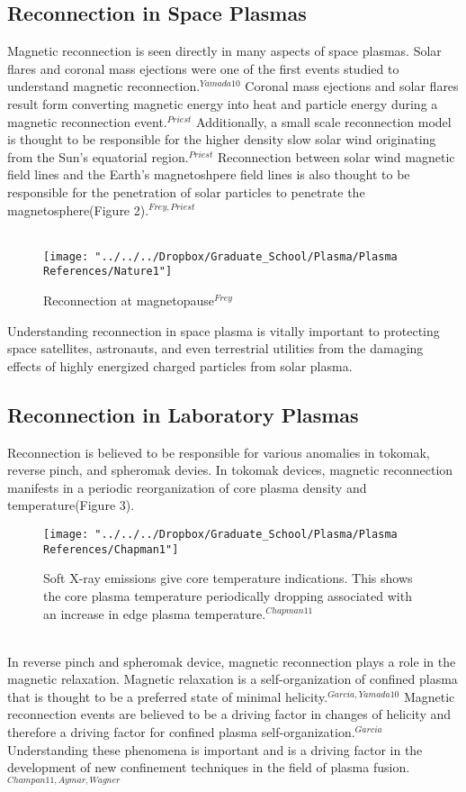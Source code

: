 \documentclass{article}
\begin{document}
\subsection{Reconnection in Space Plasmas}
Magnetic reconnection is seen directly in many aspects of space plasmas.  Solar flares and coronal mass ejections were one of the first events studied to understand magnetic reconnection.$^{Yamada10}$  Coronal mass ejections and solar flares result form converting magnetic energy into heat and particle energy during a magnetic reconnection event.$^{Priest}$  Additionally, a small scale reconnection model is thought to be responsible for the higher density slow solar wind originating from the Sun's equatorial region.$^{Priest}$  Reconnection between solar wind magnetic field lines and the Earth's magnetoshpere field lines is also thought to be responsible for the penetration of solar particles to penetrate the magnetosphere(Figure 2).$^{Frey,Priest}$\\\\\begin{figure}
\centering
\texttt{[image: "../../../Dropbox/Graduate\_School/Plasma/Plasma References/Nature1"]}
\caption{Reconnection at magnetopause$^{Frey}$}
\label{fig:Nature1}
\end{figure}
Understanding reconnection in space plasma is vitally important to protecting space satellites, astronauts, and even terrestrial utilities from the damaging effects of highly energized charged particles from solar plasma.
\subsection{Reconnection in Laboratory Plasmas}
Reconnection is believed to be responsible for various anomalies in tokomak, reverse pinch, and spheromak devies.  In tokomak devices, magnetic reconnection manifests in a periodic reorganization of core plasma density and temperature(Figure 3).  
\begin{figure}[h]
\centering
\texttt{[image: "../../../Dropbox/Graduate\_School/Plasma/Plasma References/Chapman1"]}
\caption{Soft X-ray emissions give core temperature indications. This shows the core plasma temperature periodically dropping associated with an increase in edge plasma temperature.$^{Chapman11}$}
\label{fig:Chapman1}
\end{figure}
\\In reverse pinch and spheromak device, magnetic reconnection plays a role in the magnetic relaxation.  Magnetic relaxation is a self-organization of confined plasma that is thought to be a preferred state of minimal helicity.$^{Garcia,Yamada10}$  Magnetic reconnection events are believed to be a driving factor in changes of helicity and therefore a driving factor for confined plasma self-organization.$^{Garcia}$  Understanding these phenomena is important and is a driving factor in the development of new confinement techniques in the field of plasma fusion.$^{Champan11, Aymar, Wagner}$
\end{document}
